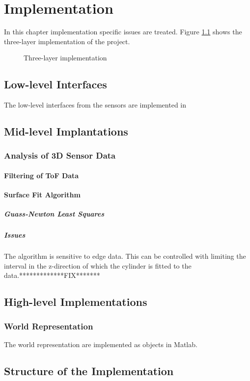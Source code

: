 
\chapter{Implementation}
In this chapter implementation specific issues are treated. Figure
\ref{chap6:fig-implementation} shows the three-layer implementation of the project.
\begin{figure}[htbp]
    \centering
    \caption{Three-layer implementation}
    \label{chap6:fig-implementation}
\end{figure}


\section{Low-level Interfaces}
The low-level interfaces from the sensors are implemented in 


\section{Mid-level Implantations}



\subsection{Analysis of 3D Sensor Data}



\subsubsection{Filtering of ToF Data}


\subsubsection{Surface Fit Algorithm}


\paragraph{Guass-Newton Least Squares}


\paragraph{Issues}
The algorithm is sensitive to edge data. This can be controlled with limiting the interval
in the z-direction of which the cylinder is fitted to the data.*************FIX*******


\section{High-level Implementations}

\subsection{World Representation}
The world representation are implemented as objects in Matlab.



\section{Structure of the Implementation}


